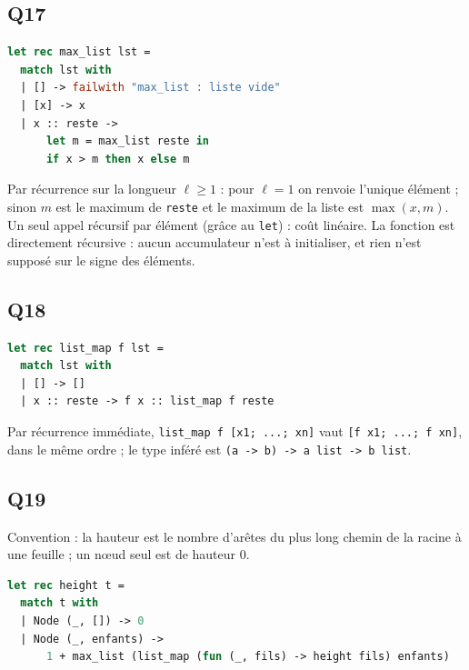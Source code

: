 \documentclass[11pt,a4paper]{article}
\begin{document}
\hypertarget{q17}{%
\subsection{Q17}\label{q17}}

\begin{lstlisting}[language=Caml]
let rec max_list lst =
  match lst with
  | [] -> failwith "max_list : liste vide"
  | [x] -> x
  | x :: reste ->
      let m = max_list reste in
      if x > m then x else m
\end{lstlisting}

Par récurrence sur la longueur \(\ell \ge 1\) : pour \(\ell = 1\) on renvoie l'unique élément ; sinon \(m\) est le maximum de \texttt{reste} et le maximum de la liste est \(\max(x, m)\). Un seul appel récursif par élément (grâce au \texttt{let}) : coût linéaire. La fonction est directement récursive : aucun accumulateur n'est à initialiser, et rien n'est supposé sur le signe des éléments.

\hypertarget{q18}{%
\subsection{Q18}\label{q18}}

\begin{lstlisting}[language=Caml]
let rec list_map f lst =
  match lst with
  | [] -> []
  | x :: reste -> f x :: list_map f reste
\end{lstlisting}

Par récurrence immédiate, \texttt{list\_map\ f\ {[}x1;\allowbreak{}\ ...;\allowbreak{}\ xn{]}\allowbreak{}} vaut \texttt{{[}f\ x1;\allowbreak{}\ ...;\allowbreak{}\ f\ xn{]}\allowbreak{}}, dans le même ordre ; le type inféré est \texttt{(\allowbreak{}\textquotesingle{}a\ -\textgreater{}\ \textquotesingle{}b)\allowbreak{}\ -\textgreater{}\ \textquotesingle{}a\ list\ -\textgreater{}\ \textquotesingle{}b\ list}.

\hypertarget{q19}{%
\subsection{Q19}\label{q19}}

Convention : la hauteur est le nombre d'arêtes du plus long chemin de la racine à une feuille ; un nœud seul est de hauteur 0.

\begin{lstlisting}[language=Caml]
let rec height t =
  match t with
  | Node (_, []) -> 0
  | Node (_, enfants) ->
      1 + max_list (list_map (fun (_, fils) -> height fils) enfants)
\end{lstlisting}
\end{document}
